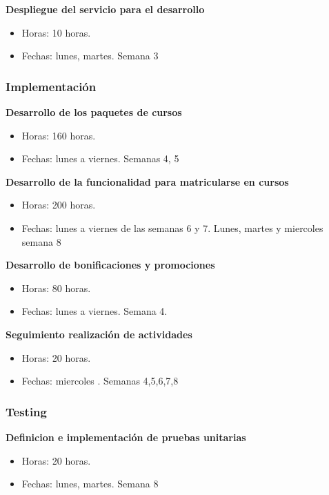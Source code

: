 \documentclass[paper=a4, fontsize=11pt, spanish]{scrartcl}
\numberwithin{equation}{section} %
\numberwithin{figure}{section} %
\numberwithin{table}{section} %
\begin{document}
 \textbf{Despliegue del servicio para el desarrollo}
 \begin{itemize}
   \item Horas: 10 horas.
   \item Fechas: lunes, martes. Semana 3
 \end{itemize}
 
\subsubsection{Implementación}

\textbf{Desarrollo de los paquetes de cursos}
\begin{itemize}
  \item Horas: 160 horas.
  \item Fechas: lunes a viernes. Semanas 4, 5
\end{itemize}

\textbf{Desarrollo de la funcionalidad para matricularse en cursos}
\begin{itemize}
  \item Horas: 200 horas.
  \item Fechas: lunes a viernes de las semanas 6 y 7. Lunes, martes y miercoles semana 8
\end{itemize}

\textbf{Desarrollo de bonificaciones y promociones}
\begin{itemize}
  \item Horas: 80 horas.
  \item Fechas: lunes a viernes. Semana 4.
\end{itemize}


\textbf{Seguimiento realización de actividades }
\begin{itemize}
  \item Horas: 20 horas.
  \item Fechas: miercoles . Semanas 4,5,6,7,8
\end{itemize}

\subsubsection{Testing}

\textbf{Definicion e implementación de pruebas unitarias }
\begin{itemize}
  \item Horas: 20 horas.
  \item Fechas: lunes, martes. Semana 8
\end{itemize}
\end{document}
